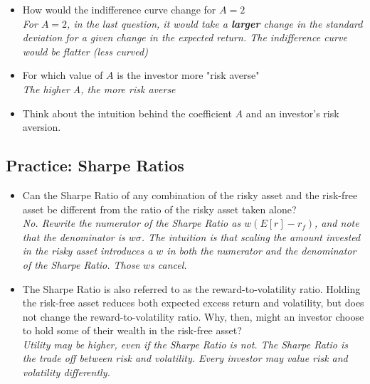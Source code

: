 \documentclass[11pt]{article}
\theoremstyle{definition}
\begin{document}
\begin{shaded}
\begin{itemize}
        \item How would the indifference curve change for $A=2$\\
    
        \textit{For $A=2$, in the last question, it would take a \textbf{larger} change in the standard deviation for a given change in the expected return.   The indifference curve would be flatter (less curved)}
        
        \item For which value of $A$ is the investor more "risk averse"\\

        \textit{The higher A, the more risk averse}
        
        \item Think about the intuition behind the coefficient $A$ and an investor's risk aversion.
    \end{itemize}

    \end{shaded}

    \begin{shaded}
    \subsection{Practice: Sharpe Ratios}
        \begin{itemize}
        \item Can the Sharpe Ratio of any combination of the risky asset and the risk-free asset be different from the ratio of the risky asset taken alone?\\

        \textit{No.  Rewrite the numerator of the Sharpe Ratio as $w(E[r] - r_f)$, and note that the denominator is $w\sigma$.    The intuition is that scaling the amount invested in the risky asset introduces a $w$ in both the numerator and the denominator of the Sharpe Ratio.   Those $w$s cancel. }
        
        \item The Sharpe Ratio is also referred to as the reward-to-volatility ratio.  Holding the risk-free asset reduces both expected excess return and volatility, but does not change the reward-to-volatility ratio.  Why, then, might an investor choose to hold some of their wealth in the risk-free asset?\\

        \textit{Utility may be higher, even if the Sharpe Ratio is not.   The Sharpe Ratio is the trade off between risk and volatility.   Every investor may value risk and volatility differently.}
    \end{itemize}

    \end{shaded}
\end{document}
